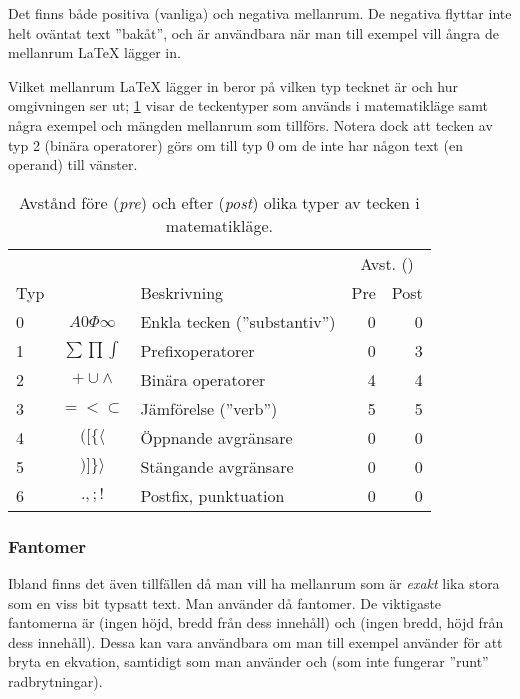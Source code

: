 \documentclass[lang=sv,ptsize=10pt,font=none,nomath,titles=bf,../../a4.tex]{subfiles}
\begin{document}
Det finns både positiva (vanliga) och negativa mellanrum. De negativa
flyttar inte helt oväntat text ”bakåt”, och är användbara när man till
exempel vill ångra de mellanrum \LaTeX{} lägger in.

Vilket mellanrum \LaTeX{} lägger in beror på vilken typ tecknet är och
hur omgivningen ser ut; \cref{tab:types} visar de teckentyper som
används i matematikläge samt några exempel och mängden mellanrum som
tillförs. Notera dock att tecken av typ 2 (binära operatorer) görs om till
typ 0 om de inte har någon text (en operand) till vänster.

\begin{table}[tbp]
	\centering 
	\caption{Avstånd före (\emph{pre}) och efter (\emph{post}) olika typer
	av tecken i matematikläge.}
	\label{tab:types}
	\begin{tabular}{lclrr}
		\toprule 
		& & & \multicolumn{2}{c}{Avst. (\si{\mu})} \\
		\cmidrule{4-5}
		Typ & & Beskrivning & Pre & Post \\
		\midrule 
		0 & \(A 0 \Phi \infty\) & Enkla tecken (”substantiv”) & 0 & 0 \\
		1 & \(\sum \prod \int\) & Prefixoperatorer & 0 & 3 \\
		2 & \(+ \cup \wedge\)   & Binära operatorer & 4 & 4 \\
		3 & \(= < \subset\)     & Jämförelse (”verb”) & 5 & 5 \\
		4 & \(( [ \{ \langle\)  & Öppnande avgränsare & 0 & 0 \\
		5 & \() ] \} \rangle\)  & Stängande avgränsare & 0 & 0 \\
		6 & \(. , ; !\)         & Postfix, punktuation & 0 & 0 \\
		\bottomrule 
	\end{tabular}
\end{table}

\subsubsection{Fantomer}
Ibland finns det även tillfällen då man vill ha mellanrum som är
\emph{exakt} lika stora som en viss bit typsatt text. Man använder då
fantomer. De viktigaste fantomerna är  (ingen höjd, bredd
från dess innehåll) och  (ingen bredd, höjd från dess 
innehåll). Dessa kan vara användbara om man till exempel använder
 för att bryta en ekvation, samtidigt som man använder
 och  (som inte fungerar ”runt” radbrytningar).
\end{document}

